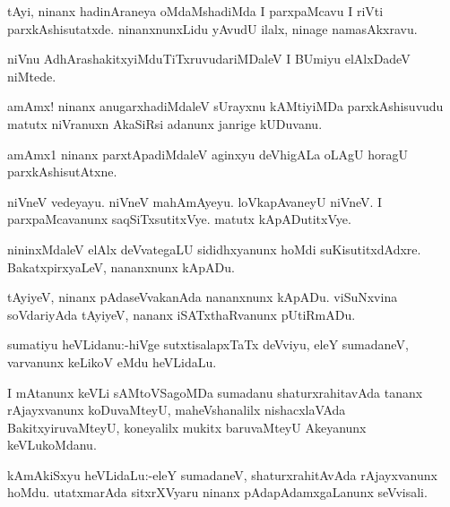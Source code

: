 \documentclass{article}
\begin{document}
\begin{mn}%
tAyi, ninanx hadinAraneya oMdaMshadiMda I parxpaMcavu I riVti parxkAshisutatxde. 
ninanxnunxLidu yAvudU ilalx, ninage namasAkxravu.
\end{mn}

\begin{mn}%
niVnu AdhArashakitxyiMduTiTxruvudariMDaleV I BUmiyu elAlxDadeV niMtede.
\end{mn}

\begin{mn}%
amAmx! ninanx anugarxhadiMdaleV sUrayxnu kAMtiyiMDa parxkAshisuvudu matutx niVranuxn 
AkaSiRsi adanunx janrige kUDuvanu.
\end{mn}

\begin{mn}%
amAmx1 ninanx parxtApadiMdaleV aginxyu deVhigALa oLAgU horagU parxkAshisutAtxne.
\end{mn}

\begin{mn}%
niVneV vedeyayu. niVneV mahAmAyeyu. loVkapAvaneyU niVneV. I parxpaMcavanunx 
saqSiTxsutitxVye. matutx kApADutitxVye.
\end{mn}

\begin{mn}%
nininxMdaleV elAlx deVvategaLU sididhxyanunx hoMdi suKisutitxdAdxre. BakatxpirxyaLeV, 
nananxnunx kApADu.
\end{mn}

\begin{mn}%
tAyiyeV, ninanx pAdaseVvakanAda nananxnunx kApADu. viSuNxvina soVdariyAda tAyiyeV, nananx 
iSATxthaRvanunx pUtiRmADu.
\end{mn}

\begin{mn}%
sumatiyu heVLidanu:-hiVge sutxtisalapxTaTx deVviyu, eleY sumadaneV, varvanunx keLikoV eMdu 
heVLidaLu.
\end{mn}

\begin{mn}%
I mAtanunx keVLi sAMtoVSagoMDa sumadanu shaturxrahitavAda tananx rAjayxvanunx koDuvaMteyU, 
maheVshanalilx nishacxlaVAda BakitxyiruvaMteyU, koneyalilx mukitx baruvaMteyU Akeyanunx 
keVLukoMdanu.
\end{mn}

\begin{mn}%
kAmAkiSxyu heVLidaLu:-eleY sumadaneV, shaturxrahitAvAda rAjayxvanunx hoMdu. utatxmarAda 
sitxrXVyaru ninanx pAdapAdamxgaLanunx seVvisali.
\end{mn}
\end{document}
